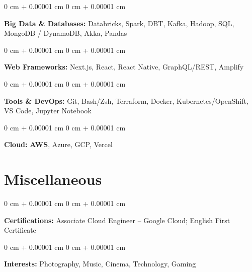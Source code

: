 \documentclass[10pt, letterpaper]{article}
\newenvironment{onecolentry}{
    \begin{adjustwidth}{
        0 cm + 0.00001 cm
    }{
        0 cm + 0.00001 cm
    }
}{
    \end{adjustwidth}
} %
\begin{document}
\vspace{0.2 cm}

\begin{onecolentry}
    \textbf{Big Data \& Databases:} Databricks, Spark, DBT, Kafka, Hadoop, SQL, MongoDB / DynamoDB, Akka, Pandas
\end{onecolentry}

\vspace{0.2 cm}

\begin{onecolentry}
    \textbf{Web Frameworks:} Next.js, React, React Native, GraphQL/REST, Amplify
\end{onecolentry}

\vspace{0.2 cm}

\begin{onecolentry}
    \textbf{Tools \& DevOps:} Git, Bash/Zsh, Terraform, Docker, Kubernetes/OpenShift, VS Code, Jupyter Notebook
\end{onecolentry}

\vspace{0.2 cm}

\begin{onecolentry}
    \textbf{Cloud:} \textbf{AWS}, Azure, GCP, Vercel
\end{onecolentry}

\section{Miscellaneous}

\begin{onecolentry}
    \textbf{Certifications:} Associate Cloud Engineer – Google Cloud; English First Certificate
\end{onecolentry}

\vspace{0.2 cm}

\begin{onecolentry}
    \textbf{Interests:} Photography, Music, Cinema, Technology, Gaming
\end{onecolentry}
    
\end{document}
